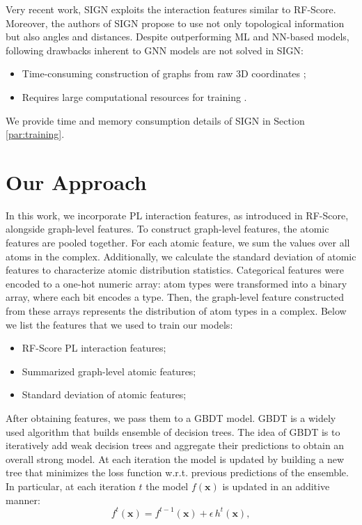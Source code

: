 \documentclass[nohyperref]{article}
\newcommand{\x}{\mathbf{x}}
\theoremstyle{plain}
\theoremstyle{definition}
\theoremstyle{remark}
\begin{document}
Very recent work, SIGN exploits the interaction features similar to RF-Score.
Moreover, the authors of SIGN propose to use not only topological information but also angles and distances. 
Despite outperforming ML and NN-based models, following drawbacks inherent to GNN models are not solved in SIGN:
\begin{itemize}
  \item Time-consuming construction of graphs from raw 3D coordinates \cite{wang2012fast};
  \item Requires large computational resources for training \cite{liu2020efficient}.
\end{itemize}
We provide time and memory consumption details of SIGN in Section \ref{par:training}.
\section{Our Approach}
\label{sec:approach}
In this work, we incorporate PL interaction features, as introduced in RF-Score, alongside graph-level features. To construct graph-level features, the atomic features are pooled together. For each atomic feature, we sum the values over all atoms in the complex. Additionally, we calculate the standard deviation of atomic features to characterize atomic distribution statistics. Categorical features were encoded to a one-hot numeric array: atom types were transformed into a binary array, where each bit encodes a type. Then, the graph-level feature constructed from these arrays represents the distribution of atom types in a complex. Below we list the features that we used to train our models:
\begin{itemize}
  \item RF-Score PL interaction features;
  \item Summarized graph-level atomic features;
  \item Standard deviation of atomic features;
  \end{itemize}
After obtaining features, we pass them to a GBDT model. GBDT \cite{friedman2001greedy} is a widely used algorithm that builds ensemble of decision trees. The idea of GBDT is to iteratively add weak decision trees and aggregate their predictions to obtain an overall strong model. At each iteration the model is updated by building a new tree that minimizes the loss function w.r.t. previous predictions of the ensemble. In particular, at each iteration $t$ the model $f(\x)$ is updated in an additive manner:
\begin{equation}
\label{eq:additive}
f^{t}(\x) = f^{t-1}(\x) + \epsilon\, h^{t}(\x),
\end{equation}
\end{document}
